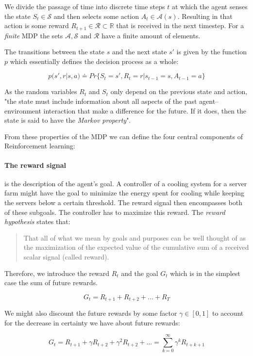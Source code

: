 We divide the passage of time into discrete time steps $ t $ at which the agent senses the state $ S_t \in \mathcal{S} $ and then selects some action $ A_t \in \mathcal{A}(s) $. Resulting in that action is some reward $ R_{t+1} \in \mathcal{R} \subset \mathbb{R} $ that is received in the next timestep. For a \textit{finite} MDP the sets $ \mathcal{A}, \mathcal{S}$ and $ \mathcal{R} $ have a finite amount of elements.

The transitions between the state $ s $ and the next state $ s' $ is given by the function $ p $ which essentially defines the decision process as a whole:

$$
    p(s', r | s, a) \doteq Pr\{S_t=s', R_t = r | s_{t-1} = s, A_{t-1}=a\}
$$

As the random variables $ R_t $ and $ S_t $ only depend on the previous state and action, "the state must include information about all aspects of the past agent–environment interaction that make a difference for the future. If it does, then the state is said to have the \textit{Markov property}". \cite[p. 48]{sutton_reinforcement_2018}

From these properties of the MDP we can define the four central components of Reinforcement learning:

\paragraph{The reward signal} is the description of the agent's goal. A controller of a cooling system for a server farm might have the goal to minimize the energy spent for cooling while keeping the servers below a certain threshold. The reward signal then encompasses both of these subgoals. The controller has to maximize this reward. The \textit{reward hypothesis} states that:
\begin{quotation}
    That all of what we mean by goals and purposes can be well thought of as the maximization of the expected value of the cumulative sum of a received scalar signal (called reward).
\end{quotation}
Therefore, we introduce the reward $R_t $ and the goal $ G_t $ which is in the simplest case the sum of future rewards.

$$ G_t = R_{t+1} + R_{t+2} + ... + R_T $$

We might also discount the future rewards by some factor $\gamma \in [0, 1] $ to account for the decrease in certainty we have about future rewards:

$$ G_t = R_{t+1} + \gamma R_{t+2} + \gamma^2 R_{t+2} + ... = \sum_{k=0}^{\infty} \gamma^kR_{t+k+1}$$

